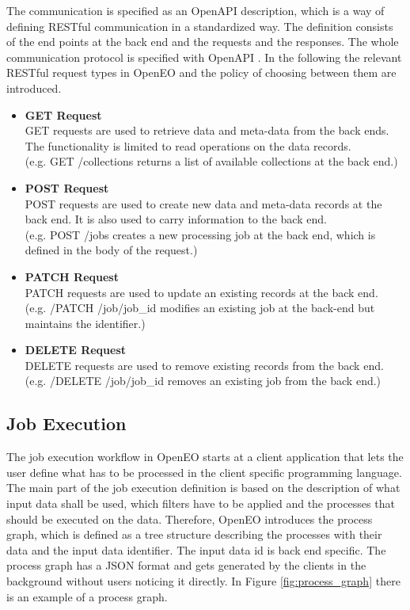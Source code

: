 \documentclass[draft,final]{vutinfth} %
\begin{document}
The communication is specified as an OpenAPI description, which is a way of defining RESTful communication in a standardized way. The definition consists of the end points at the back end and the requests and the responses. The whole communication protocol is specified with OpenAPI \cite{openapi}. 
In the following the relevant RESTful request types in OpenEO and the policy of choosing between them are introduced.

\begin{itemize}
	\item \textbf{GET Request} \\
	GET requests are used to retrieve data and meta-data from the back ends. The functionality is limited to read operations on the data records. \\(e.g. GET /collections returns a list of available collections at the back end.)
	\item \textbf{POST Request} \\ 
	POST requests are used to create new data and meta-data records at the back end. It is also used to carry information to the back end.  \\(e.g. POST /jobs creates a new processing job at the back end, which is defined in the body of the request.)  
	\item \textbf{PATCH Request} \\
	PATCH requests are used to update an existing records at the back end. \\(e.g. /PATCH /job/{job\_id} modifies an existing job at the back-end but maintains the identifier.)
	\item \textbf{DELETE Request} \\ 
	DELETE requests are used to remove existing records from the back end. \\(e.g. /DELETE /job/{job\_id} removes an existing job from the back end.)
\end{itemize}

\subsection{Job Execution}\label{Job Execution}
The job execution workflow in OpenEO starts at a client application that lets the user define what has to be processed in the client specific programming language.
The main part of the job execution definition is based on the description of what input data shall be used, which filters have to be applied and the processes that should be executed on the data. Therefore, OpenEO introduces the process graph, which is defined as a tree structure describing the processes with their data and the input data identifier. The input data id is back end specific. The process graph has a JSON format and gets generated by the clients in the background without users noticing it directly. In Figure \ref{fig:process_graph} there is an example of a process graph. 
\end{document}
